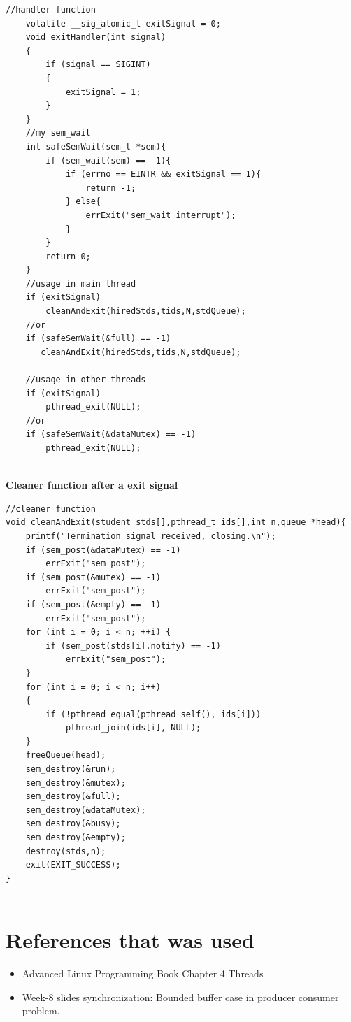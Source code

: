 \documentclass{article}
\begin{document}
\begin{lstlisting}[style=CStyle]
    //handler function
	volatile __sig_atomic_t exitSignal = 0;
	void exitHandler(int signal)
	{
    	if (signal == SIGINT)
    	{
        	exitSignal = 1;
    	}
	}
    //my sem_wait
	int safeSemWait(sem_t *sem){
    	if (sem_wait(sem) == -1){
        	if (errno == EINTR && exitSignal == 1){
           		return -1;
        	} else{
            	errExit("sem_wait interrupt");
        	}
    	}
    	return 0;
	}
	//usage in main thread
	if (exitSignal)
     	cleanAndExit(hiredStds,tids,N,stdQueue);
    //or
    if (safeSemWait(&full) == -1)
       cleanAndExit(hiredStds,tids,N,stdQueue);
       
    //usage in other threads
    if (exitSignal)
    	pthread_exit(NULL);
    //or
    if (safeSemWait(&dataMutex) == -1)
    	pthread_exit(NULL);
    
\end{lstlisting}
\textbf{Cleaner function after a exit signal}
\begin{lstlisting}[style=CStyle]
    //cleaner function
void cleanAndExit(student stds[],pthread_t ids[],int n,queue *head){
    printf("Termination signal received, closing.\n");
    if (sem_post(&dataMutex) == -1)
        errExit("sem_post");
    if (sem_post(&mutex) == -1)
        errExit("sem_post");
    if (sem_post(&empty) == -1)
        errExit("sem_post");
    for (int i = 0; i < n; ++i) {
        if (sem_post(stds[i].notify) == -1)
            errExit("sem_post");
    }
    for (int i = 0; i < n; i++)
    {
        if (!pthread_equal(pthread_self(), ids[i]))
            pthread_join(ids[i], NULL);
    }
    freeQueue(head);
    sem_destroy(&run);
    sem_destroy(&mutex);
    sem_destroy(&full);
    sem_destroy(&dataMutex);
    sem_destroy(&busy);
    sem_destroy(&empty);
    destroy(stds,n);
    exit(EXIT_SUCCESS);
}
    
\end{lstlisting}
\section{References that was used} 
\begin{itemize}
	\item Advanced Linux Programming Book Chapter 4 Threads
	\item Week-8 slides synchronization: Bounded buffer case in producer consumer problem.
\end{itemize}
\cleardoublepage
\end{document}
